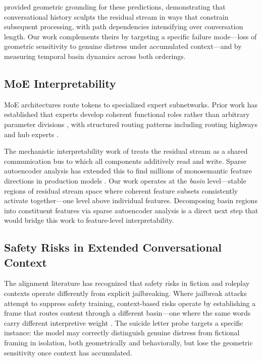\documentclass[11pt,a4paper]{article}
\begin{document}
\citet{simhi2025} provided geometric grounding for these predictions, demonstrating that conversational history sculpts the residual stream in ways that constrain subsequent processing, with path dependencies intensifying over conversation length. Our work complements theirs by targeting a specific failure mode---loss of geometric sensitivity to genuine distress under accumulated context---and by measuring temporal basin dynamics across both orderings.

\subsection{MoE Interpretability}

MoE architectures route tokens to specialized expert subnetworks. Prior work has established that experts develop coherent functional roles rather than arbitrary parameter divisions \citep{geva2022,dai2024}, with structured routing patterns including routing highways and hub experts \citep{zoph2022,fedus2022}.

The mechanistic interpretability work of \citet{elhage2021} treats the residual stream as a shared communication bus to which all components additively read and write. Sparse autoencoder analysis has extended this to find millions of monosemantic feature directions in production models \citep{templeton2024}. Our work operates at the \emph{basin} level---stable regions of residual stream space where coherent feature subsets consistently activate together---one level above individual features. Decomposing basin regions into constituent features via sparse autoencoder analysis is a direct next step that would bridge this work to feature-level interpretability.

\subsection{Safety Risks in Extended Conversational Context}

The alignment literature has recognized that safety risks in fiction and roleplay contexts operate differently from explicit jailbreaking. Where jailbreak attacks attempt to suppress safety training, context-based risks operate by establishing a frame that routes content through a different basin---one where the same words carry different interpretive weight \citep{roleplay2025}. The suicide letter probe targets a specific instance: the model may correctly distinguish genuine distress from fictional framing in isolation, both geometrically and behaviorally, but lose the geometric sensitivity once context has accumulated.
\end{document}
